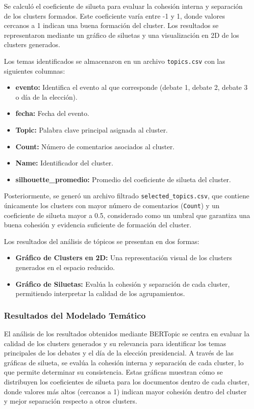 \documentclass[10pt, a4paper]{article}
\begin{document}
	Se calculó el coeficiente de silueta para evaluar la cohesión interna y separación de los clusters formados. Este coeficiente varía entre -1 y 1, donde valores cercanos a 1 indican una buena formación del cluster. Los resultados se representaron mediante un gráfico de siluetas y una visualización en 2D de los clusters generados.
	
	Los temas identificados se almacenaron en un archivo \texttt{topics.csv} con las siguientes columnas:
	\begin{itemize}
		\item \textbf{evento:} Identifica el evento al que corresponde (debate 1, debate 2, debate 3 o día de la elección).
		\item \textbf{fecha:} Fecha del evento.
		\item \textbf{Topic:} Palabra clave principal asignada al cluster.
		\item \textbf{Count:} Número de comentarios asociados al cluster.
		\item \textbf{Name:} Identificador del cluster.
		\item \textbf{silhouette\_promedio:} Promedio del coeficiente de silueta del cluster.
	\end{itemize}
	
	Posteriormente, se generó un archivo filtrado \texttt{selected\_topics.csv}, que contiene únicamente los clusters con mayor número de comentarios (\texttt{Count}) y un coeficiente de silueta mayor a 0.5, considerado como un umbral que garantiza una buena cohesión y evidencia suficiente de formación del cluster.

	Los resultados del análisis de tópicos se presentan en dos formas:
	\begin{itemize}
		\item \textbf{Gráfico de Clusters en 2D:} Una representación visual de los clusters generados en el espacio reducido.
		\item \textbf{Gráfico de Siluetas:} Evalúa la cohesión y separación de cada cluster, permitiendo interpretar la calidad de los agrupamientos.
	\end{itemize}
	
	
	\subsubsection{Resultados del Modelado Temático}
	
	El análisis de los resultados obtenidos mediante BERTopic se centra en evaluar la calidad de los clusters generados y su relevancia para identificar los temas principales de los debates y el día de la elección presidencial. A través de las gráficas de silueta, se evalúa la cohesión interna y separación de cada cluster, lo que permite determinar su consistencia. Estas gráficas muestran cómo se distribuyen los coeficientes de silueta para los documentos dentro de cada cluster, donde valores más altos (cercanos a 1) indican mayor cohesión dentro del cluster y mejor separación respecto a otros clusters.
	
\end{document}
